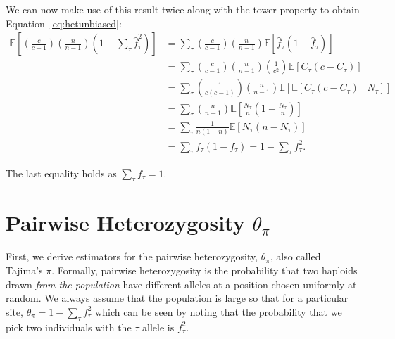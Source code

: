 \documentclass[a4paper,fontsize=9pt,DIV=14]{scrartcl}
\newcommand{\samplesize}{n}
\newcommand{\coverage}{c}
\newcommand{\empfreq}{\widehat{f}}
\begin{document}
We can now make use of this result twice along with the tower property to obtain Equation~\ref{eq:hetunbiased}:
\begin{align*}
\mathbb{E}\left[\left(\frac{\coverage}{\coverage-1}\right)\left(\frac{\samplesize}{\samplesize-1}\right)\left(1-\sum_\tau\empfreq_\tau^2\right)\right] &= \sum_\tau\left(\frac{\coverage}{\coverage-1}\right)\left(\frac{\samplesize}{\samplesize-1}\right) \mathbb{E}\left[\empfreq_\tau(1-\empfreq_\tau)\right]\\
&=  \sum_\tau\left(\frac{\coverage}{\coverage-1}\right)\left(\frac{\samplesize}{\samplesize-1}\right) \left(\frac{1}{\coverage^2}\right) \mathbb{E}\left[C_\tau\left(c-C_\tau\right)\right]\\
&= \sum_\tau\left(\frac{1}{\coverage(\coverage-1)}\right)\left(\frac{\samplesize}{\samplesize-1}\right) \mathbb{E}\left[\mathbb{E}\left[C_\tau\left(c-C_\tau\right) \mid N_\tau\right]\right]\\
&= \sum_\tau\left(\frac{\samplesize}{\samplesize-1}\right) \mathbb{E}\left[\frac{N_\tau}{\samplesize}\left(1-\frac{N_\tau}{\samplesize}\right)\right]\\
&= \sum_\tau\frac{1}{\samplesize(1-\samplesize)}\mathbb{E}\left[N_\tau\left(\samplesize - N_\tau\right)\right]\\
&= \sum_\tau f_\tau(1-f_\tau) = 1 - \sum_\tau f_\tau^2.
\end{align*}

The last equality holds as $\sum_\tau f_\tau = 1$.


\section{Pairwise Heterozygosity \texorpdfstring{$\theta_\pi$}{}}
\label{supp:sec:ThetaPi}

First, we derive estimators for the pairwise heterozygosity, $\theta_\pi$, also called Tajima's $\pi$.  Formally, pairwise heterozygosity is the probability that two haploids drawn \emph{from the population} have different alleles at a position chosen uniformly at random.  We always assume that the population is large so that for a particular site, $\theta_\pi = 1 -\sum_\tau f_\tau^2$ which can be seen by noting that the probability that we pick two individuals with the $\tau$ allele is $f_\tau^2$.
\end{document}
